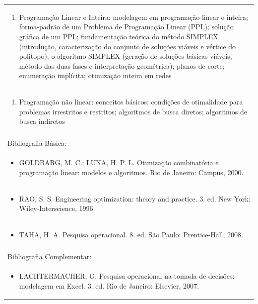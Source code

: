 \documentclass[11pt]{article}
\begin{document}
\begin{center}
\begin{longtable}{|p{4cm}|p{4cm}|p{4cm}|p{4cm}|}
\multicolumn{4}{|p{\dimexpr 16cm + 6\tabcolsep\relax}|}{\begin{enumerate}[start=2]\item Programação Linear e Inteira: modelagem em programação linear e inteira; forma-padrão de um Problema de Programação Linear (PPL); solução gráfica de um PPL; fundamentação teórica do método SIMPLEX (introdução, caracterização do conjunto de soluções viáveis e vértice do politopo); o algoritmo SIMPLEX (geração de soluções básicas viáveis, método das duas fases e interpretação geométrica); planos de corte; enumeração implícita; otimização inteira em redes\end{enumerate}}\\
\multicolumn{4}{|p{\dimexpr 16cm + 6\tabcolsep\relax}|}{\begin{enumerate}[start=3]\item Programação não linear: conceitos básicos; condições de otimalidade para problemas irrestritos e restritos; algoritmos de busca diretos; algoritmos de busca indiretos\end{enumerate}}\\
\multicolumn{4}{|p{\dimexpr 16cm + 6\tabcolsep\relax}|}{}\\
\hline
\multicolumn{4}{|p{16cm}|}{Bibliografia Básica:}\\*
\multicolumn{4}{|p{\dimexpr 16cm + 6\tabcolsep\relax}|}{\begin{itemize}\item GOLDBARG, M. C.; LUNA, H. P. L. Otimização combinatória e programação linear: modelos e algoritmos. Rio de Janeiro: Campus, 2000.\end{itemize}}\\
\multicolumn{4}{|p{\dimexpr 16cm + 6\tabcolsep\relax}|}{\begin{itemize}\item RAO, S. S. Engineering optimization: theory and practice. 3. ed. New York: Wiley-Interscience, 1996.\end{itemize}}\\
\multicolumn{4}{|p{\dimexpr 16cm + 6\tabcolsep\relax}|}{\begin{itemize}\item TAHA, H. A. Pesquisa operacional. 8. ed. São Paulo: Prentice-Hall, 2008.\end{itemize}}\\
\multicolumn{4}{|p{16cm}|}{}\\
\hline
\multicolumn{4}{|p{16cm}|}{Bibliografia Complementar:}\\*
\multicolumn{4}{|p{\dimexpr 16cm + 6\tabcolsep\relax}|}{\begin{itemize}\item LACHTERMACHER, G. Pesquisa operacional na tomada de decisões: modelagem em Excel. 3. ed. Rio de Janeiro: Elsevier, 2007.\end{itemize}}\\

\end{longtable}
\end{center}
\end{document}
